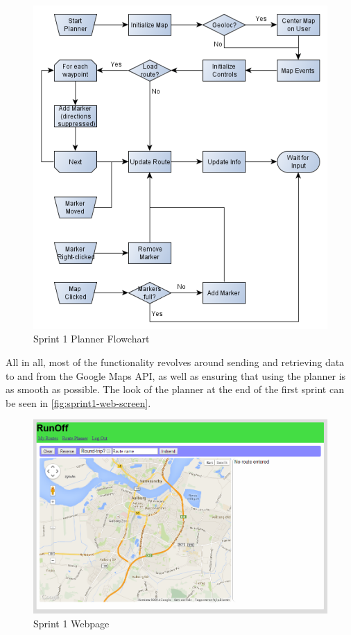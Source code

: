 \begin{figure}[ht]
 \caption{Sprint 1 Planner Flowchart}
 \label{fig:sprint1-web-flow}
 \includegraphics[width=\textwidth]{img/sprint1webflow.png}
\end{figure}


All in all, most of the functionality revolves around sending and retrieving data to and from the Google Maps \ac{API}, as well as ensuring that using the planner is as smooth as possible. The look of the planner at the end of the first sprint can be seen in \autoref{fig:sprint1-web-screen}.

\begin{figure}[ht]
 \caption{Sprint 1 Webpage}
 \label{fig:sprint1-web-screen}
 \includegraphics[width=\textwidth]{img/webplanner1.png}
\end{figure}

